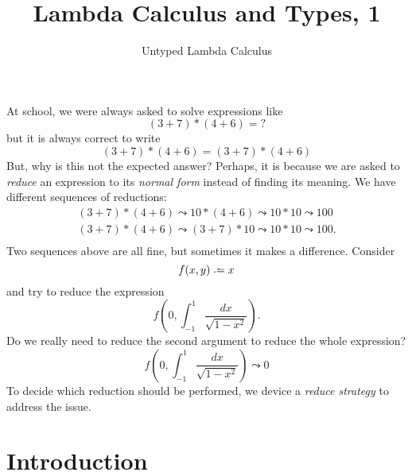 \title{Lambda Calculus and Types, 1}
\subtitle{Untyped Lambda Calculus}

\begin{frame}
\maketitle
\end{frame}
At school, we were always asked to solve expressions like
\[
  (3 + 7) * (4 + 6)= ?
\]
but it is always correct to write 
\[
  (3 + 7) * (4 + 6)= (3 + 7) * (4 + 6)
\]
But, why is this not the expected answer? Perhaps, it is because we are asked to
\emph{reduce} an expression to its \emph{normal form} instead of finding its
meaning. We have different sequences of reductions:
\begin{align*}
  (3 + 7) * (4 + 6) \leadsto 10 * (4 + 6) \leadsto 10 * 10 \leadsto 100 \\
  (3 + 7) * (4 + 6) \leadsto (3 + 7) * 10 \leadsto 10 * 10 \leadsto 100. \\
\end{align*}
Two sequences above are all fine, but sometimes it makes a difference. Consider 
\[
  f(x, y) \defeq x
\]
and try to reduce the expression
\[
  f(0, \int _{-1}^{1}{\frac {dx}{\sqrt {1-x^{2}}}}).
\]
Do we really need to reduce the second argument to reduce the whole expression?
\[
  f(0, \int _{-1}^{1}{\frac {dx}{\sqrt {1-x^{2}}}}) \leadsto 0
\]
To decide which reduction should be performed, we device a \emph{reduce
  strategy} to address the issue. 

\section{Introduction}

